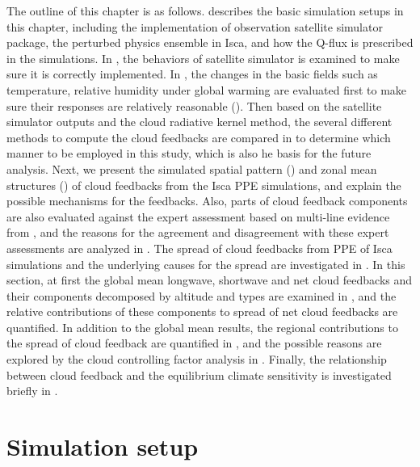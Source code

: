 The outline of this chapter is as follows.  describes the basic simulation setups in this chapter, including the implementation of observation satellite simulator package, the perturbed physics ensemble in Isca, and how the Q-flux is prescribed in the simulations. In , the behaviors of satellite simulator is examined to make sure it is correctly implemented. In , the changes in the basic fields such as temperature, relative humidity under global warming are evaluated first to make sure their responses are relatively reasonable (). Then based on the satellite simulator outputs and the cloud radiative kernel method, the several different methods to compute the cloud feedbacks are compared in  to determine which manner to be employed in this study, which is also he basis for the future analysis. Next, we present the simulated spatial pattern () and zonal mean structures () of cloud feedbacks from the Isca PPE simulations, and explain the possible mechanisms for the feedbacks. Also, parts of cloud feedback components are also evaluated against the expert assessment based on multi-line evidence from \cite{Sherwood2020}, and the reasons for the agreement and disagreement with these expert assessments are analyzed in . The spread of cloud feedbacks from PPE of Isca simulations and the underlying causes for the spread are investigated in . In this section, at first the global mean longwave, shortwave and net cloud feedbacks and their components decomposed by altitude and types are examined in , and the relative contributions of these components to spread of net cloud feedbacks are quantified. In addition to the global mean results, the regional contributions to the spread of cloud feedback are quantified in , and the possible reasons are explored by the cloud controlling factor analysis in . Finally, the relationship between cloud feedback and the equilibrium climate sensitivity is investigated briefly in .

\section{Simulation setup}
\label{sec:simulation_setup_cld_fbk}

